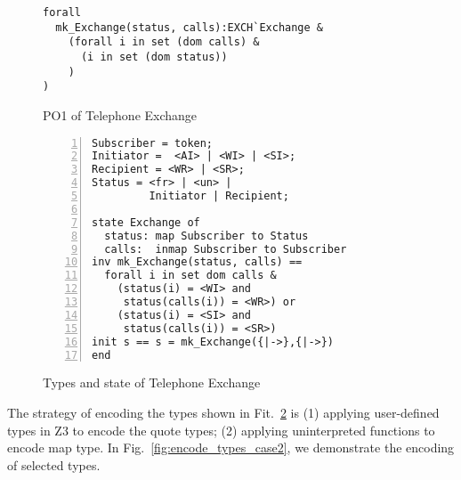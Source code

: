 \begin{figure}[t]
\begin{center}
\begin{mdframed}[roundcorner=5pt]
\begin{Verbatim}[fontsize=\small]
forall
  mk_Exchange(status, calls):EXCH`Exchange &
    (forall i in set (dom calls) &
      (i in set (dom status))
    )
)
\end{Verbatim}
\end{mdframed}
\vspace{-10pt}
\caption{PO1 of Telephone Exchange}
\label{fig:po1_case2}
\end{center}
\end{figure}


\begin{figure}[t]
\begin{center}
\begin{mdframed}[roundcorner=5pt]
\begin{Verbatim}[fontsize=\small,numbers=left]
Subscriber = token;
Initiator =  <AI> | <WI> | <SI>;
Recipient = <WR> | <SR>;
Status = <fr> | <un> |
         Initiator | Recipient;
                                                                      
state Exchange of
  status: map Subscriber to Status
  calls:  inmap Subscriber to Subscriber
inv mk_Exchange(status, calls) == 
  forall i in set dom calls & 
    (status(i) = <WI> and
     status(calls(i)) = <WR>) or
    (status(i) = <SI> and
     status(calls(i)) = <SR>)
init s == s = mk_Exchange({|->},{|->})
end
\end{Verbatim}
\end{mdframed}
\vspace{-10pt}
\caption{Types and state of Telephone Exchange}
\label{fig:types_case2}
\end{center}
\end{figure}

The strategy of encoding the types shown in Fit.~\ref{fig:types_case2} is (1) applying user-defined types in Z3 to encode the quote types; (2) applying uninterpreted functions to encode map type. In Fig.~\ref{fig:encode_types_case2}, we demonstrate the encoding of selected types. 

